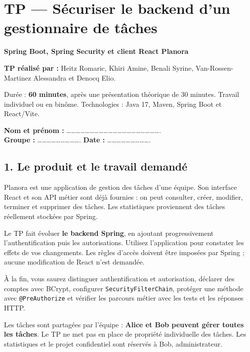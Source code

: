 \documentclass[
  french,
  10pt,
  a4paper,
]{article}
\author{}
\date{}
\begin{document}
\section{TP --- Sécuriser le backend d'un gestionnaire de
tâches}\label{tp-suxe9curiser-le-backend-dun-gestionnaire-de-tuxe2ches}

\textbf{Spring Boot, Spring Security et client React Planora}

\textbf{TP réalisé par :} Heitz Romaric, Khiri Amine, Benali Syrine,
Van-Rossen-Martinez Alessandra et Denocq Elio.

Durée : \textbf{60 minutes}, après une présentation théorique de 30
minutes. Travail individuel ou en binôme. Technologies : Java 17, Maven,
Spring Boot et React/Vite.

\textbf{Nom et prénom :}
\ldots\ldots\ldots\ldots\ldots\ldots\ldots\ldots\ldots\ldots\ldots\ldots\ldots\ldots\ldots\ldots\ldots\ldots\ldots\ldots.\\
\textbf{Groupe :}
\ldots\ldots\ldots\ldots\ldots\ldots\ldots\ldots\ldots. \textbf{Date :}
\ldots\ldots\ldots\ldots\ldots\ldots\ldots\ldots\ldots.

\subsection{1. Le produit et le travail
demandé}\label{le-produit-et-le-travail-demanduxe9}

Planora est une application de gestion des tâches d'une équipe. Son
interface React et son API métier sont déjà fournies : on peut
consulter, créer, modifier, terminer et supprimer des tâches. Les
statistiques proviennent des tâches réellement stockées par Spring.

Le TP fait évoluer \textbf{le backend Spring}, en ajoutant
progressivement l'authentification puis les autorisations. Utilisez
l'application pour constater les effets de vos changements. Les règles
d'accès doivent être imposées par Spring ; aucune modification de React
n'est demandée.

À la fin, vous saurez distinguer authentification et autorisation,
déclarer des comptes avec BCrypt, configurer
\texttt{SecurityFilterChain}, protéger une méthode avec
\texttt{@PreAuthorize} et vérifier les parcours métier avec les tests et
les réponses HTTP.

Les tâches sont partagées par l'équipe : \textbf{Alice et Bob peuvent
gérer toutes les tâches}. Le TP ne met pas en place de propriété
individuelle des tâches. Les statistiques et le projet confidentiel sont
réservés à Bob, administrateur.
\end{document}
